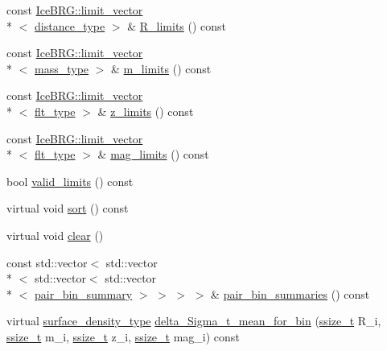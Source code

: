 \begin{DoxyCompactItemize}
const \hyperlink{classIceBRG_1_1limit__vector}{Ice\-B\-R\-G\-::limit\-\_\-vector}\\*
$<$ \hyperlink{namespaceIceBRG_a45499647eb87e24c10ab32c628711cec}{distance\-\_\-type} $>$ \& \hyperlink{classIceBRG_1_1pair__bins__summary_acc7b46adaf08cb9026ae6cb629149a03}{R\-\_\-limits} () const 
\item 
const \hyperlink{classIceBRG_1_1limit__vector}{Ice\-B\-R\-G\-::limit\-\_\-vector}\\*
$<$ \hyperlink{namespaceIceBRG_a1be72ac4918a9b029f2eefa084213e35}{mass\-\_\-type} $>$ \& \hyperlink{classIceBRG_1_1pair__bins__summary_a86827c9706e81ed9355e2392c8f97461}{m\-\_\-limits} () const 
\item 
const \hyperlink{classIceBRG_1_1limit__vector}{Ice\-B\-R\-G\-::limit\-\_\-vector}\\*
$<$ \hyperlink{lib_2IceBRG__main_2common_8h_ad0f130a56eeb944d9ef2692ee881ecc4}{flt\-\_\-type} $>$ \& \hyperlink{classIceBRG_1_1pair__bins__summary_a6e991158024292432a331e17afe7772d}{z\-\_\-limits} () const 
\item 
const \hyperlink{classIceBRG_1_1limit__vector}{Ice\-B\-R\-G\-::limit\-\_\-vector}\\*
$<$ \hyperlink{lib_2IceBRG__main_2common_8h_ad0f130a56eeb944d9ef2692ee881ecc4}{flt\-\_\-type} $>$ \& \hyperlink{classIceBRG_1_1pair__bins__summary_ae901835c073a1b9080d5fc9d372cb076}{mag\-\_\-limits} () const 
\item 
bool \hyperlink{classIceBRG_1_1pair__bins__summary_aee577469277b57e336d06c0a55362af1}{valid\-\_\-limits} () const 
\item 
virtual void \hyperlink{classIceBRG_1_1pair__bins__summary_a02eff77640a691bae15d619cd138aec4}{sort} () const 
\item 
virtual void \hyperlink{classIceBRG_1_1pair__bins__summary_a5c15793df751321aef8bed2526c3cbe6}{clear} ()
\item 
const std\-::vector$<$ std\-::vector\\*
$<$ std\-::vector$<$ std\-::vector\\*
$<$ \hyperlink{classIceBRG_1_1pair__bin__summary}{pair\-\_\-bin\-\_\-summary} $>$ $>$ $>$ $>$ \& \hyperlink{classIceBRG_1_1pair__bins__summary_a50f037d0f5014adb5eb4e7c4d0b0092e}{pair\-\_\-bin\-\_\-summaries} () const 
\item 
virtual \hyperlink{namespaceIceBRG_a80c597ef5ba0a32491d32a9f0083b02d}{surface\-\_\-density\-\_\-type} \hyperlink{classIceBRG_1_1pair__bins__summary_a6b03be80b8d12b5d8ef4707e594fa911}{delta\-\_\-\-Sigma\-\_\-t\-\_\-mean\-\_\-for\-\_\-bin} (\hyperlink{lib_2IceBRG__main_2common_8h_ab322a3e50421dc5f0c43316b1b373592}{ssize\-\_\-t} R\-\_\-i, \hyperlink{lib_2IceBRG__main_2common_8h_ab322a3e50421dc5f0c43316b1b373592}{ssize\-\_\-t} m\-\_\-i, \hyperlink{lib_2IceBRG__main_2common_8h_ab322a3e50421dc5f0c43316b1b373592}{ssize\-\_\-t} z\-\_\-i, \hyperlink{lib_2IceBRG__main_2common_8h_ab322a3e50421dc5f0c43316b1b373592}{ssize\-\_\-t} mag\-\_\-i) const 

\end{DoxyCompactItemize}
